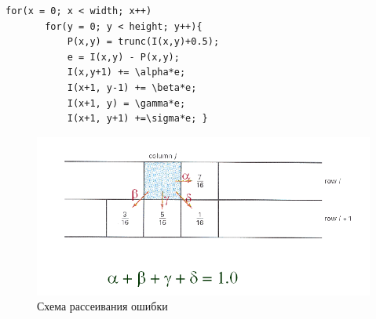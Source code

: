    \begin{lstlisting}[style=pseudocode,caption={Алгоритм Флойда-Стейнберга}]
   for(x = 0; x < width; x++)
       for(y = 0; y < height; y++){
           P(x,y) = trunc(I(x,y)+0.5);
           e = I(x,y) - P(x,y);
           I(x,y+1) += \alpha*e;
           I(x+1, y-1) += \beta*e;
           I(x+1, y) = \gamma*e;
           I(x+1, y+1) +=\sigma*e; }
   \end{lstlisting}
    \begin{figure}
    	\centering
    	\includegraphics[width=\textwidth]{img/1.png}
    	\caption{Схема рассеивания ошибки}
    	\label{fig:spire03}
    \end{figure}

